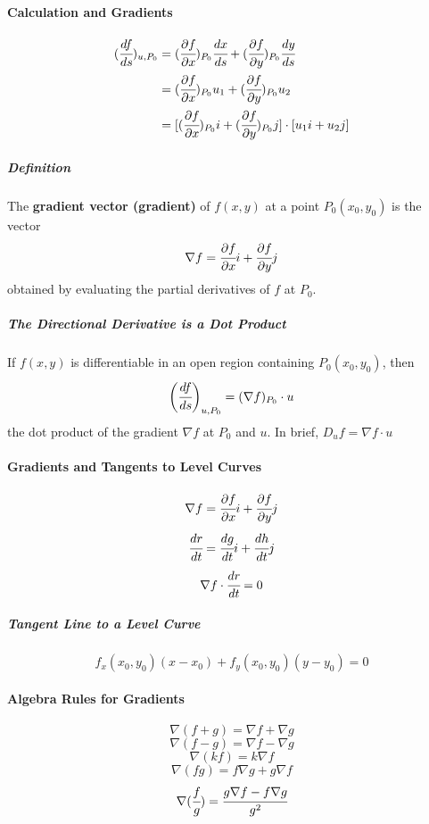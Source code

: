 \documentclass{article}
\begin{document}
            \paragraph{Calculation and Gradients}
                \begin{equation}
                    \begin{aligned}
                        (\cfrac{df}{ds})_{u,P_0}&=(\cfrac{\partial f}{\partial x})_{P_0}\cfrac{dx}{ds}+(\cfrac{\partial f}{\partial y})_{P_0}\cfrac{dy}{ds}\\
                        &=(\cfrac{\partial f}{\partial x})_{P_0}u_1+(\cfrac{\partial f}{\partial y})_{P_0}u_2\\
                        &=[(\cfrac{\partial f}{\partial x})_{P_0}i+(\cfrac{\partial f}{\partial y})_{P_0}j]\cdot[u_1i+u_2j]\\
                    \end{aligned}
                \end{equation}
                \subparagraph{Definition} The \textbf{gradient vector (gradient)} of $f(x,y)$ at a point $P_0(x_0,y_0)$ is the vector
                \[\nabla f=\cfrac{\partial f}{\partial x}i+\cfrac{\partial f}{\partial y}j\]
                obtained by evaluating the partial derivatives of $f$ at $P_0$.
                \subparagraph{The Directional Derivative is a Dot Product} If $f(x,y)$ is differentiable in an open region containing $P_0(x_0,y_0)$, then 
                \[\bigg(\cfrac{df}{ds}\bigg)_{u,P_0}=(\nabla f)_{P_0}\cdot u\]
                the dot product of the gradient $\nabla f$ at $P_0$ and $u$. In brief, $D_uf=\nabla f\cdot u$
            \paragraph{Gradients and Tangents to Level Curves}
                \[\nabla f=\cfrac{\partial f}{\partial x}i+\cfrac{\partial f}{\partial y}j\]
                \[\cfrac{dr}{dt}=\cfrac{dg}{dt}i+\cfrac{dh}{dt}j\]
                \[\nabla f\cdot \cfrac{dr}{dt}=0\]
                \subparagraph{Tangent Line to a Level Curve}
                    \[f_x(x_0,y_0)(x-x_0)+f_y(x_0,y_0)(y-y_0)=0\]
            \paragraph{Algebra Rules for Gradients}
                \[\nabla(f+g)=\nabla f+\nabla g\]
                \[\nabla(f-g)=\nabla f-\nabla g\]
                \[\nabla(kf)=k\nabla f\]
                \[\nabla(fg)=f\nabla g+g\nabla f\]
                \[\nabla(\cfrac{f}{g})=\cfrac{g\nabla f-f\nabla g}{g^2}\]
\end{document}
